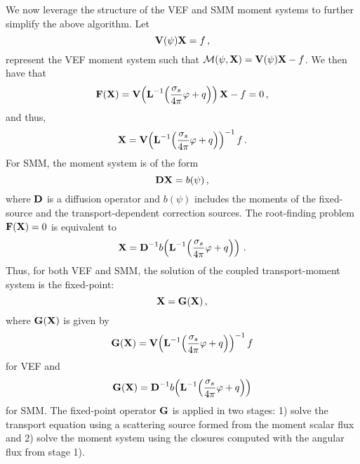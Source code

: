 \documentclass[../doc.tex]{subfiles}
\begin{document}
We now leverage the structure of the VEF and SMM moment systems to further simplify the above algorithm. 
Let 
	\begin{equation}
		\boldsymbol{\mathrm{V}}(\psi)\boldsymbol{\mathrm{X}} = f \,, 
	\end{equation}
represent the VEF moment system such that $\mathcal{M}(\psi,\boldsymbol{\mathrm{X}}) = \boldsymbol{\mathrm{V}}(\psi)\boldsymbol{\mathrm{X}} - f$. We then have that 
	\begin{equation}
		\boldsymbol{\mathrm{F}}(\boldsymbol{\mathrm{X}}) = \boldsymbol{\mathrm{V}}\!\left( \boldsymbol{\mathrm{L}}^{-1}\!\left( \frac{\sigma_s}{4\pi}\varphi + q \right) \right) \boldsymbol{\mathrm{X}} - f = 0 \,,  
	\end{equation}
and thus, 
	\begin{equation} \label{moment:vef_iter}
		\boldsymbol{\mathrm{X}} = \boldsymbol{\mathrm{V}}\!\left( \boldsymbol{\mathrm{L}}^{-1}\!\left( \frac{\sigma_s}{4\pi}\varphi + q \right) \right)^{-1} f \,. 
	\end{equation}
For SMM, the moment system is of the form
	\begin{equation}
		\boldsymbol{\mathrm{D}}\boldsymbol{\mathrm{X}} = b(\psi) \,,
	\end{equation}
where $\boldsymbol{\mathrm{D}}$ is a diffusion operator and $b(\psi)$ includes the moments of the fixed-source and the transport-dependent correction sources. The root-finding problem $\boldsymbol{\mathrm{F}}(\boldsymbol{\mathrm{X}}) = 0$ is equivalent to 
	\begin{equation} \label{moment:smm_iter}
		\boldsymbol{\mathrm{X}} = \boldsymbol{\mathrm{D}}^{-1}b\!\left( \boldsymbol{\mathrm{L}}^{-1}\!\left( \frac{\sigma_s}{4\pi}\varphi + q \right) \right) \,. 
	\end{equation}
Thus, for both VEF and SMM, the solution of the coupled transport-moment system is the fixed-point: 
	\begin{equation} \label{moment:G}
		\boldsymbol{\mathrm{X}} = \boldsymbol{\mathrm{G}}(\boldsymbol{\mathrm{X}}) \,,
	\end{equation}
where $\boldsymbol{\mathrm{G}}(\boldsymbol{\mathrm{X}})$ is given by 
	\begin{equation} \label{moment:vef_fp}
		\boldsymbol{\mathrm{G}}(\boldsymbol{\mathrm{X}}) = \boldsymbol{\mathrm{V}}\!\left( \boldsymbol{\mathrm{L}}^{-1}\!\left( \frac{\sigma_s}{4\pi}\varphi + q \right) \right)^{-1} f
	\end{equation}
for VEF and 
	\begin{equation} \label{moment:smm_fp}
		\boldsymbol{\mathrm{G}}(\boldsymbol{\mathrm{X}}) = \boldsymbol{\mathrm{D}}^{-1}b\!\left( \boldsymbol{\mathrm{L}}^{-1}\!\left( \frac{\sigma_s}{4\pi}\varphi + q \right) \right)
	\end{equation}
for SMM.
The fixed-point operator $\boldsymbol{\mathrm{G}}$ is applied in two stages: 1) solve the transport equation using a scattering source formed from the moment scalar flux and 2) solve the moment system using the closures computed with the angular flux from stage 1). 
\end{document}
